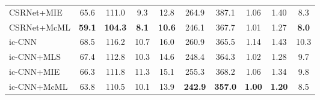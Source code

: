 \documentclass[sigconf]{acmart}
\begin{document}
\begin{table}[t]
\begin{center}
\begin{tabular}{|l|cc|cc|cc|cc|c|}
CSRNet+MIE      & 65.6                 & 111.0                 & 9.3                  & 12.8                  & 264.9               & 387.1               & 1.06             & 1.40            & 8.3                   \\
CSRNet+McML     & \textbf{59.1}        & \textbf{104.3}        & \textbf{8.1}         & \textbf{10.6}         & 246.1               & 367.7               & 1.01             & 1.27            & \textbf{8.0}          \\ \hline\hline
ic-CNN~\cite{deep-training-ICCNN-18}          & 68.5                 & 116.2                 & 10.7                 & 16.0                  & 260.9               & 365.5               & 1.14             & 1.43            & 10.3                  \\
ic-CNN+MLS      & 67.4                 & 112.8                 & 10.3                  & 14.6                  & 248.4               & 364.3               & 1.02             & 1.28            & 9.7                   \\
ic-CNN+MIE      & 66.3                 & 111.8                 & 11.3                 & 15.1                  & 255.3               & 368.2               & 1.06             & 1.34            & 9.8                   \\ 
ic-CNN+McML     & 63.8                 & 110.5                 & 10.1                 & 13.9                  & \textbf{242.9}      & \textbf{357.0}      & \textbf{1.00}    & \textbf{1.20}   & 8.5                   \\ \hline
\end{tabular}
\end{center}
\vspace{-4mm}
\label{tab:ablation-study}
\end{table}

\end{document}

